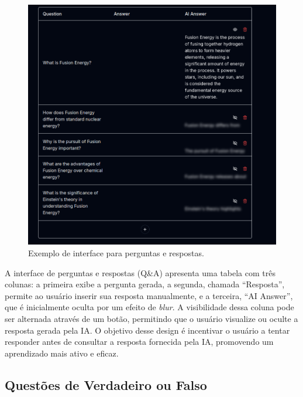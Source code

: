 \documentclass[tcc,capa]{texufpel}
\begin{document}
\begin{figure}[H]
\centering
\includegraphics[width=\textwidth,height=0.45\textheight,keepaspectratio]{exemplo-slides/graphics/images/q_a.png}
\caption{Exemplo de interface para perguntas e respostas.}
\label{fig:qa_interface}
\end{figure}

A interface de perguntas e respostas (Q\&A) apresenta uma tabela com três colunas: a primeira exibe a pergunta gerada, a segunda, chamada ``Resposta'', permite ao usuário inserir sua resposta manualmente, e a terceira, ``AI Answer'', que é inicialmente oculta por um efeito de \textit{blur}. A visibilidade dessa coluna pode ser alternada através de um botão, permitindo que o usuário visualize ou oculte a resposta gerada pela IA. O objetivo desse design é incentivar o usuário a tentar responder antes de consultar a resposta fornecida pela IA, promovendo um aprendizado mais ativo e eficaz.


\subsection{Questões de Verdadeiro ou Falso}
\end{document}

